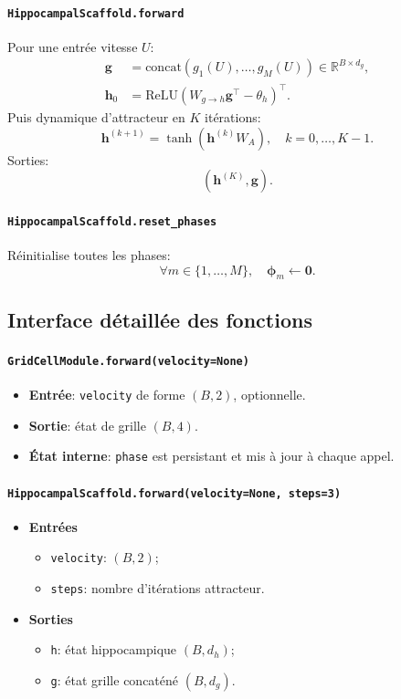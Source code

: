 \documentclass[12pt,a4paper]{article}
\begin{document}
\paragraph{\texttt{HippocampalScaffold.forward}}
Pour une entrée vitesse $U$:
\begin{align}
\mathbf{g} &= \mathrm{concat}\left(g_1(U),\dots,g_M(U)\right)\in\mathbb{R}^{B\times d_g},\\
\mathbf{h}_0 &= \mathrm{ReLU}(W_{g\to h}\mathbf{g}^\top - \theta_h)^\top.
\end{align}
Puis dynamique d'attracteur en $K$ itérations:
\[
\mathbf{h}^{(k+1)}=\tanh(\mathbf{h}^{(k)}W_A),\quad k=0,\dots,K-1.
\]
Sorties:
\[
(\mathbf{h}^{(K)},\mathbf{g}).
\]

\paragraph{\texttt{HippocampalScaffold.reset\_phases}}
Réinitialise toutes les phases:
\[
\forall m\in\{1,\dots,M\},\quad \boldsymbol{\phi}_m\leftarrow \mathbf{0}.
\]

\subsection{Interface détaillée des fonctions}

\paragraph{\texttt{GridCellModule.forward(velocity=None)}}
\begin{itemize}[leftmargin=*]
    \item \textbf{Entrée}: \texttt{velocity} de forme $(B,2)$, optionnelle.
    \item \textbf{Sortie}: état de grille $(B,4)$.
    \item \textbf{État interne}: \texttt{phase} est persistant et mis à jour à chaque appel.
\end{itemize}

\paragraph{\texttt{HippocampalScaffold.forward(velocity=None, steps=3)}}
\begin{itemize}[leftmargin=*]
    \item \textbf{Entrées}
    \begin{itemize}
        \item \texttt{velocity}: $(B,2)$;
        \item \texttt{steps}: nombre d'itérations attracteur.
    \end{itemize}
    \item \textbf{Sorties}
    \begin{itemize}
        \item \texttt{h}: état hippocampique $(B,d_h)$;
        \item \texttt{g}: état grille concaténé $(B,d_g)$.
    \end{itemize}
\end{itemize}
\end{document}
